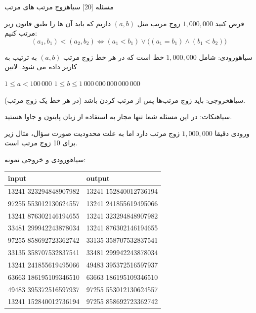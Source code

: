 ‌مسئله [20]
‌سیاه{زوج مرتب های مرتب}

فرض کنید $1,000,000$ زوج مرتب مثل $(a,b)$ داریم که باید آن ها را طبق قانون زیر مرتب کنیم:
$$(a_1,b_1) < (a_2,b_2) \iff (a_1 < b_1)\lor\big( (a_1=b_1) \land (b_1<b_2)\big)$$


‌سیاه{ورودی:}
شامل $1,000,000$ خط است که در هر خط زوج مرتب $(a,b)$ به ترتیب به کاربر داده می شود.
‌لاتین{
	\begin{center}
		$1 \le a < 100\,000$
		\linebreak[1]
		$1 \le b \le 1\,000\,000\,000\,000\,000$
	\end{center}
}
‌سیاه{خروجی:}
باید زوج مرتب‌ها پس از مرتب کردن باشد (در هر خط یک زوج مرتب).

‌سیاه{نکات:}
در این مسئله شما تنها مجاز به استفاده از زبان پایتون و جاوا هستید.

ورودی دقیقا $1,000,000$ زوج مرتب دارد اما به علت محدودیت صورت سؤال، مثال زیر برای 10 زوج مرتب است.

‌سیاه{ورودی و خروجی نمونه:}
\begin{latin}
	\begin{tabularx}{\textwidth}{|X | X|}
		\hline
		\textbf{input} &
		\textbf{output}\\
		\hline
		13241 323294848907982&
		13241 152840012736194\\
		
		97255 553012130624557 &
		13241 241855619495066\\
		
	    13241 876302146194655 &
		13241 323294848907982\\
		
	    33481 299942243878034&
		13241 876302146194655\\
		
		97255 858692723362742 &
		33135 358707532837541\\
		
		33135 358707532837541 &
		33481 299942243878034\\
		
		13241 241855619495066 &
		49483 395372516597937\\
		
			63663 186195109346510 &
	63663 186195109346510\\
		
				49483 395372516597937 &
		97255 553012130624557\\
		
				13241 152840012736194 &
		97255 858692723362742\\
		\hline
		
	\end{tabularx}
\end{latin}


